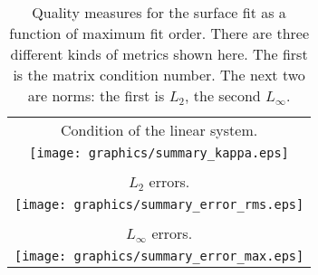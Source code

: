 \begin{table}[htbp]
\caption[Quality measures for the surface fit]{Quality measures for the surface fit as a function of maximum fit order. There are three different kinds of metrics shown here. The first is the matrix condition number. The next two are norms: the first is $L_{2}$, the second $L_{\infty}$.}
\begin{center}
\begin{tabular}{c}
%
Condition of the linear system. \\
\texttt{[image: graphics/summary\_kappa.eps]} \\
 \\
%
$L_{2}$ errors. \\
\texttt{[image: graphics/summary\_error\_rms.eps]} \\
 \\
%
$L_{\infty}$ errors. \\
\texttt{[image: graphics/summary\_error\_max.eps]}
 \\
%
\end{tabular}
\end{center}
\label{tab:quality summary}
\end{table}%

\endinput %